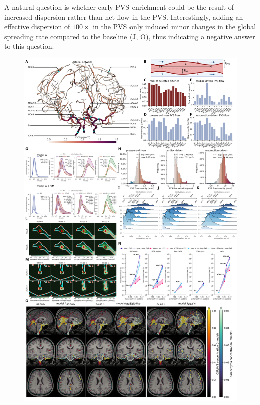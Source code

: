 \documentclass[fleqn,10pt]{wlscirep}
\begin{document}
A natural question is whether early PVS enrichment could be the result
of increased dispersion rather than net flow in the
PVS. Interestingly, adding an effective dispersion of $100 \times$ in
the PVS only induced minor changes in the global spreading rate
compared to the baseline (J, O), thus indicating a
negative answer to this question.
\begin{figure}
    \centering
    \includegraphics[height=\textheight]{figures/figure3.png}
    \caption{}
    \label{fig:pvs}
\end{figure}

\end{document}
